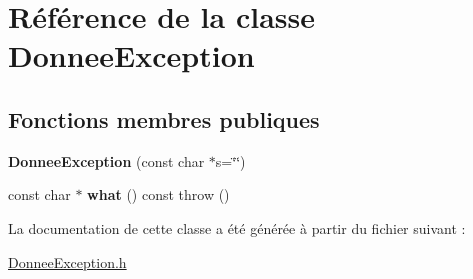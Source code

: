 \hypertarget{class_donnee_exception}{\section{Référence de la classe Donnee\-Exception}
\label{class_donnee_exception}
}
\subsection*{Fonctions membres publiques}
\begin{DoxyCompactItemize}
\item 
\hypertarget{class_donnee_exception_ab8fc67df4f6f0990ac50c6a33f14db87}{{\bfseries Donnee\-Exception} (const char $\ast$s=\char`\"{}\char`\"{})}\label{class_donnee_exception_ab8fc67df4f6f0990ac50c6a33f14db87}

\item 
\hypertarget{class_donnee_exception_ade7e28dfb8e19d15f0026d64626c7be0}{const char $\ast$ {\bfseries what} () const   throw ()}\label{class_donnee_exception_ade7e28dfb8e19d15f0026d64626c7be0}

\end{DoxyCompactItemize}


La documentation de cette classe a été générée à partir du fichier suivant \-:\begin{DoxyCompactItemize}
\item 
\hyperlink{_donnee_exception_8h}{Donnee\-Exception.\-h}\end{DoxyCompactItemize}
